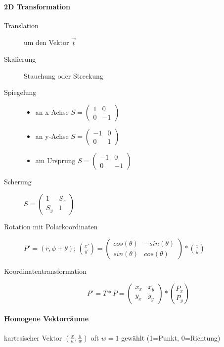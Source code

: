 \documentclass[10pt,landscape]{article}
\begin{document}
\begin{multicols}{3}
\paragraph*{2D Transformation}
\begin{description}
  \item[Translation] um den Vektor $\vec{t}$
  \item[Skalierung] Stauchung oder Streckung
  \item[Spiegelung]
        \begin{itemize}
          \item an x-Achse $S=\begin{pmatrix} 1 & 0 \\ 0 & -1 \end{pmatrix}$
          \item an y-Achse $S=\begin{pmatrix} -1 & 0 \\ 0 & 1 \end{pmatrix}$
          \item am Ursprung $S=\begin{pmatrix} -1 & 0 \\ 0 & -1 \end{pmatrix}$
        \end{itemize}
  \item[Scherung] $S=\begin{pmatrix} 1 & S_x \\ S_y & 1 \end{pmatrix}$
  \item[Rotation mit Polarkoordinaten] $P'=(r,\phi+\theta)$; $\binom{x'}{y'}=\begin{pmatrix} cos(\theta) & -sin(\theta) \\ sin(\theta) & cos(\theta)\end{pmatrix}*\binom{x}{y}$
  \item[Koordinatentransformation] $$P' =T*P = \begin{pmatrix} x_x & x_y\\ y_x & y_y \end{pmatrix} * \binom{P_x}{P_y}$$
\end{description}

\paragraph*{Homogene Vektorräume}
kartesischer Vektor $(\frac{x}{w},\frac{y}{w})$ oft $w=1$ gewählt (1=Punkt, 0=Richtung)


\end{multicols}
\end{document}
